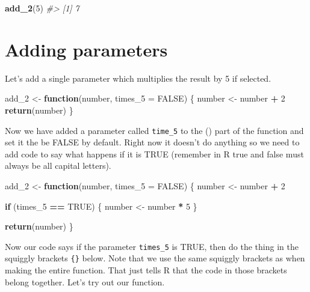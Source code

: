 \documentclass[
  12pt,
]{book}
\newenvironment{Shaded}{\begin{snugshade}}{\end{snugshade}}
\newcommand{\CommentTok}[1]{\textcolor[rgb]{0.56,0.35,0.01}{\textit{#1}}}
\newcommand{\ControlFlowTok}[1]{\textcolor[rgb]{0.13,0.29,0.53}{\textbf{#1}}}
\newcommand{\DataTypeTok}[1]{\textcolor[rgb]{0.13,0.29,0.53}{#1}}
\newcommand{\DecValTok}[1]{\textcolor[rgb]{0.00,0.00,0.81}{#1}}
\newcommand{\KeywordTok}[1]{\textcolor[rgb]{0.13,0.29,0.53}{\textbf{#1}}}
\newcommand{\NormalTok}[1]{#1}
\newcommand{\OperatorTok}[1]{\textcolor[rgb]{0.81,0.36,0.00}{\textbf{#1}}}
\newcommand{\OtherTok}[1]{\textcolor[rgb]{0.56,0.35,0.01}{#1}}
\newcommand{\StringTok}[1]{\textcolor[rgb]{0.31,0.60,0.02}{#1}}
\begin{document}
\begin{Shaded}
\begin{Highlighting}[]
\KeywordTok{add\_2}\NormalTok{(}\DecValTok{5}\NormalTok{)}
\CommentTok{\#> [1] 7}
\end{Highlighting}
\end{Shaded}

\hypertarget{adding-parameters}{%
\section{Adding parameters}\label{adding-parameters}}

Let's add a single parameter which multiplies the result by 5 if selected.

\begin{Shaded}
\begin{Highlighting}[]
\NormalTok{add\_}\DecValTok{2}\NormalTok{ <{-}}\StringTok{ }\ControlFlowTok{function}\NormalTok{(number, }\DataTypeTok{times\_5 =} \OtherTok{FALSE}\NormalTok{) \{}
\NormalTok{  number <{-}}\StringTok{ }\NormalTok{number }\OperatorTok{+}\StringTok{ }\DecValTok{2}
  \KeywordTok{return}\NormalTok{(number)}
\NormalTok{\}}
\end{Highlighting}
\end{Shaded}

Now we have added a parameter called \texttt{time\_5} to the () part of the function and set it the be FALSE by default. Right now it doesn't do anything so we need to add code to say what happens if it is TRUE (remember in R true and false must always be all capital letters).

\begin{Shaded}
\begin{Highlighting}[]
\NormalTok{add\_}\DecValTok{2}\NormalTok{ <{-}}\StringTok{ }\ControlFlowTok{function}\NormalTok{(number, }\DataTypeTok{times\_5 =} \OtherTok{FALSE}\NormalTok{) \{}
\NormalTok{  number <{-}}\StringTok{ }\NormalTok{number }\OperatorTok{+}\StringTok{ }\DecValTok{2}
  
  \ControlFlowTok{if}\NormalTok{ (times\_}\DecValTok{5} \OperatorTok{==}\StringTok{ }\OtherTok{TRUE}\NormalTok{) \{}
\NormalTok{    number <{-}}\StringTok{ }\NormalTok{number }\OperatorTok{*}\StringTok{ }\DecValTok{5}
\NormalTok{  \}}
  
  \KeywordTok{return}\NormalTok{(number)}
\NormalTok{\}}
\end{Highlighting}
\end{Shaded}

Now our code says if the parameter \texttt{times\_5} is TRUE, then do the thing in the squiggly brackets \texttt{\{\}} below. Note that we use the same squiggly brackets as when making the entire function. That just tells R that the code in those brackets belong together. Let's try out our function.
\end{document}
